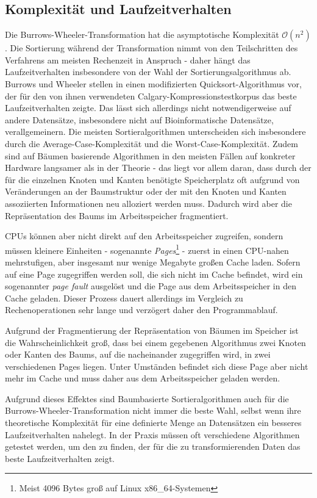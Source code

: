 \documentclass[ngerman,pdftex,paper=A4,DIV=calc,titlepage,12pt]{scrartcl}
\newtheorem[L]{boxedDefinition}{Definition}
\begin{document}
\subsection{Komplexität und Laufzeitverhalten}\label{ssec:complexity}
Die Burrows-Wheeler-Transformation hat die asymptotische Komplexität $\mathcal{O}(n^2)$. Die Sortierung während der Transformation nimmt von den Teilschritten des Verfahrens am meisten Rechenzeit in Anspruch - daher hängt das Laufzeitverhalten insbesondere von der Wahl der Sortierungsalgorithmus ab. Burrows und Wheeler stellen in \cite{burrows1994block} einen modifizierten Quicksort-Algorithmus vor, der für den von ihnen verwendeten Calgary-Kompressionstestkorpus das beste Laufzeitverhalten zeigte. Das lässt sich allerdings nicht notwendigerweise auf andere Datensätze, insbesondere nicht auf Bioinformatische Datensätze, verallgemeinern.
Die meisten Sortieralgorithmen unterscheiden sich insbesondere durch die Average-Case-Komplexität und die Worst-Case-Komplexität. Zudem sind auf Bäumen basierende Algorithmen in den meisten Fällen auf konkreter Hardware langsamer als in der Theorie - das liegt vor allem daran, dass durch der für die einzelnen Knoten und Kanten benötigte Speicherplatz oft aufgrund von Veränderungen an der Baumstruktur oder der mit den Knoten und Kanten assoziierten Informationen neu alloziert werden muss. Dadurch wird aber die Repräsentation des Baums im Arbeitsspeicher fragmentiert.

CPUs können aber nicht direkt auf den Arbeitsspeicher zugreifen, sondern müssen kleinere Einheiten - sogenannte \textit{Pages}\footnote{Meist 4096 Bytes groß auf Linux x86\_64-Systemen} - zuerst in einen CPU-nahen mehrstufigen, aber insgesamt nur wenige Megabyte großen Cache laden. Sofern auf eine Page zugegriffen werden soll, die sich nicht im Cache befindet, wird ein sogenannter \textit{page fault} ausgelöst und die Page aus dem Arbeitsspeicher in den Cache geladen. Dieser Prozess dauert allerdings im Vergleich zu Rechenoperationen sehr lange und verzögert daher den Programmablauf.

Aufgrund der Fragmentierung der Repräsentation von Bäumen im Speicher ist die Wahrscheinlichkeit groß, dass bei einem gegebenen Algorithmus zwei Knoten oder Kanten des Baums, auf die nacheinander zugegriffen wird, in zwei verschiedenen Pages liegen. Unter Umständen befindet sich diese Page aber nicht mehr im Cache und muss daher aus dem Arbeitsspeicher geladen werden. 

Aufgrund dieses Effektes sind Baumbasierte Sortieralgorithmen auch für die Burrows-Wheeler-Transformation nicht immer die beste Wahl, selbst wenn ihre theoretische Komplexität für eine definierte Menge an Datensätzen ein besseres Laufzeitverhalten nahelegt. In der Praxis müssen oft verschiedene Algorithmen getestet werden, um den zu finden, der für die zu transformierenden Daten das beste Laufzeitverhalten zeigt.
\end{document}
